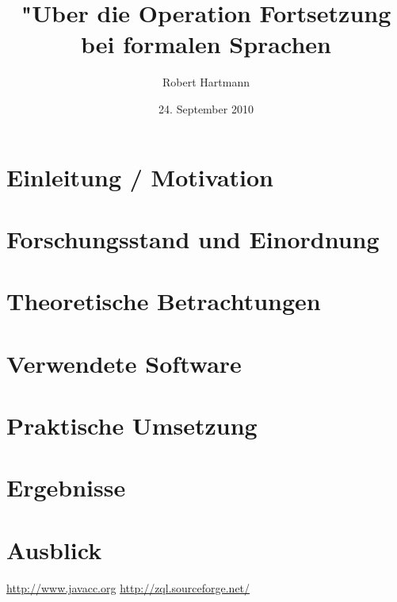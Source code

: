 \documentclass[12pt]{scrreprt}
\author{Robert Hartmann}
\title{"Uber die Operation Fortsetzung bei formalen Sprachen}
\date{24. September 2010}
\theoremstyle{remark}
\begin{document}

%

\pagestyle{plain}
\tableofcontents

\onehalfspacing

\chapter{Einleitung / Motivation}


\chapter{Forschungsstand und Einordnung}


\chapter{Theoretische Betrachtungen}


\chapter{Verwendete Software}


\chapter{Praktische Umsetzung}


\chapter{Ergebnisse}


\chapter{Ausblick}


\begin{thebibliography}{9}
\url{http://www.javacc.org}
\url{http://zql.sourceforge.net/}
\end{thebibliography}



\end{document}
